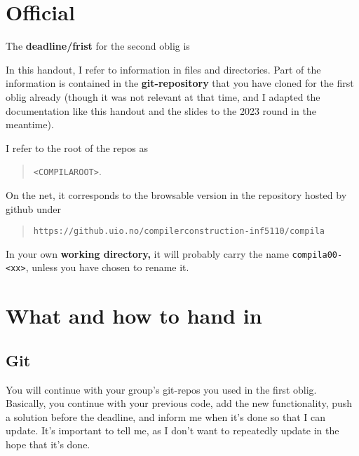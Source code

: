 \documentclass[11pt,freeform]{handout}[2014/08/13]
\begin{document}
\thispagestyle{empty}



\section{Official }
\label{sec:official-info}




\hrulefill{}

The \textbf{deadline/frist}  for the second oblig is

\begin{quote}
  \textbf{\deadlinetwo}
\end{quote}






In this handout, I refer to information in files and directories. Part of
the information is contained in the \textbf{git-repository} that you have
cloned for the first oblig already (though it was not relevant at that
time, and I adapted the documentation like this handout and the slides to
the 2023 round in the meantime).

I refer to the root of the repos as 
\begin{quote}
  \texttt{<COMPILAROOT>}.   
\end{quote}
On the net, it corresponds to the browsable version in the repository
hosted by github under

\begin{quote}
  \texttt{https://github.uio.no/compilerconstruction-inf5110/compila}
\end{quote}

In your own \textbf{working directory,} it will probably carry the name
\texttt{compila00-<xx>}, unless you have chosen to rename it.




\section{What and how to hand in}
\label{sec:what-how}


\subsection{Git}
\label{sec:git}

You will continue with your group's git-repos you used in the first oblig.
Basically, you continue with your previous code, add the new functionality,
push a solution before the deadline, and inform me when it's done so that I
can update. It's important to tell me, as I don't want to repeatedly update
in the hope that it's done.
\end{document}
